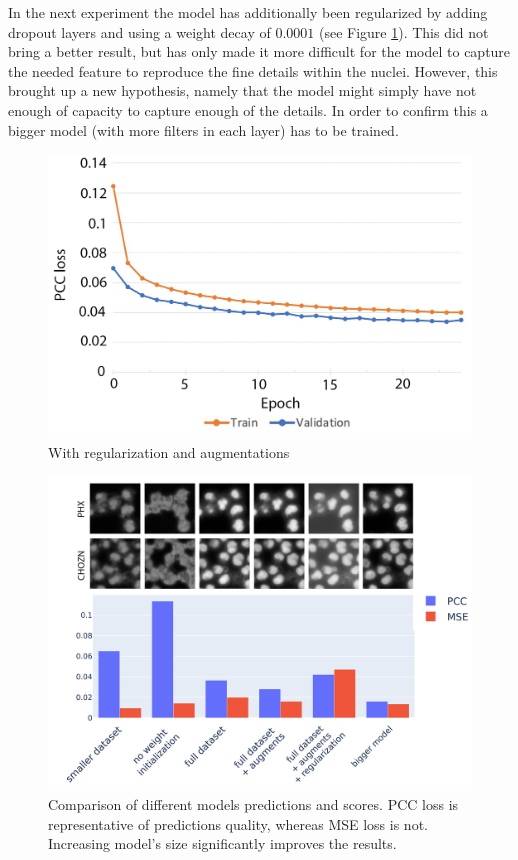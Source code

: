 In the next experiment the model has additionally been regularized by adding dropout layers and using a weight decay of $0.0001$ (see Figure \ref{fig:full-dataset-pcc-regularized}). This did not bring a better result, but has only made it more difficult for the model to capture the needed feature to reproduce the fine details within the nuclei. However, this brought up a new hypothesis, namely that the model might simply have not enough of capacity to capture enough of the details. In order to confirm this a bigger model (with more filters in each layer) has to be trained.
\begin{figure}[htb]
	\begin{center}
		\includegraphics[width=0.5\linewidth]{bilder/nuclei/full-dataset-regularized.png}
		\caption{With regularization and augmentations}\label{fig:full-dataset-pcc-regularized}
	\end{center}
\end{figure}

\begin{figure}[htb]
	\begin{center}
		\includegraphics[width=0.75\linewidth]{bilder/nuclei/comparison-chzn-phx.png}
		\caption[Comparison of different models predictions and scores]%
		{Comparison of different models predictions and scores. PCC loss is representative of predictions quality, whereas MSE loss is not. Increasing model's size significantly improves the results.}\label{fig:nuclei-comparison-predictions}
	\end{center}
\end{figure}

